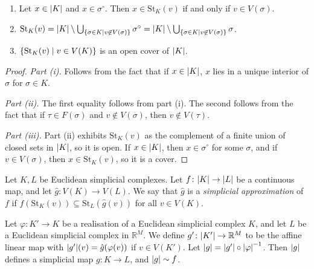 \begin{lemma}
	\begin{enumerate}
		\item Let \( x \in \abs{K} \) and \( x \in \sigma^\circ \).
			Then \( x \in \mathrm{St}_K(v) \) if and only if \( v \in V(\sigma) \).
		\item \( \mathrm{St}_K(v) = \abs{K} \setminus \bigcup_{\qty{\sigma \in K \mid v \not\in V(\sigma)}} \sigma^\circ = \abs{K} \setminus \bigcup_{\qty{\sigma \in K \mid v \not\in V(\sigma)}} \sigma \).
		\item \( \qty{\mathrm{St}_K(v) \mid v \in V(K)} \) is an open cover of \( \abs{K} \).
	\end{enumerate}
\end{lemma}
\begin{proof}
	\emph{Part (i).}
	Follows from the fact that if \( x \in \abs{K} \), \( x \) lies in a unique interior of \( \sigma \) for \( \sigma \in K \).

	\emph{Part (ii).}
	The first equality follows from part (i).
	The second follows from the fact that if \( \tau \in F(\sigma) \) and \( v \not\in V(\sigma) \), then \( v \not\in V(\tau) \).

	\emph{Part (iii).}
	Part (ii) exhibits \( \mathrm{St}_K(v) \) as the complement of a finite union of closed sets in \( \abs{K} \), so it is open.
	If \( x \in \abs{K} \), then \( x \in \sigma^\circ \) for some \( \sigma \), and if \( v \in V(\sigma) \), then \( x \in \mathrm{St}_K(v) \), so it is a cover.
\end{proof}
\begin{definition}
	Let \( K, L \) be Euclidean simplicial complexes.
	Let \( f \colon \abs{K} \to \abs{L} \) be a continuous map, and let \( \hat g \colon V(K) \to V(L) \).
	We say that \( \hat g \) is a \emph{simplicial approximation} of \( f \) if \( f(\mathrm{St}_K(v)) \subseteq \mathrm{St}_L(\hat g(v)) \) for all \( v \in V(K) \).
\end{definition}
\begin{theorem}
	Let \( \varphi \colon K' \to K \) be a realisation of a Euclidean simplicial complex \( K \), and let \( L \) be a Euclidean simplicial complex in \( \mathbb R^M \).
	We define \( g' \colon \abs{K'} \to \mathbb R^M \) to be the affine linear map with \( \abs{g'}(v) = \hat g(\varphi(v)) \) if \( v \in V(K') \).
	Let \( \abs{g} = \abs{g'} \circ \abs{\varphi}^{-1} \).
	Then \( \abs{g} \) defines a simplicial map \( g \colon K \to L \), and \( \abs{g} \sim f \).
\end{theorem}
